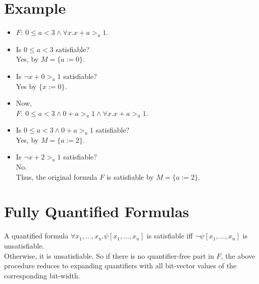 \documentclass{article}
\begin{document}
\section{Example}
	\begin{itemize}
		\item $F :\ 0 \le a < 3 \land \forall x . x + a >_u 1$.
		\item Is $0 \le a < 3$ satisfiable? \\
			\null\qquad Yes, by $M = \{a := 0\}$.
		\item Is $\neg x + 0 >_u 1$ satisfiable? \\
			\null\qquad Yes by $\{x := 0\}$.
		\item Now,\\
			$F :\ 0 \le a < 3 \land 0 + a >_u 1 \land \forall x . x + a >_u 1$.
		\item Is $0 \le a < 3 \land 0 + a >_u 1$ 
		satisfiable?\\
			\null\qquad Yes, by $M = \{a := 2\}$.
		\item Is $\neg x + 2 >_u 1$ satisfiable? \\
		\null\qquad No.\\
		\null\qquad Thus, the original formula $F$ is 
		satisfiable by $M = \{a := 2\}$.
	\end{itemize}
\section{Fully Quantified Formulas}
	A quantified formula $\forall x_1, ..., x_n. \psi [x_1, ..., x_n]$ is satisfiable iff 
	$\neg \psi [x_1, ..., x_n]$ is unsatisfiable.\\
	Otherwise, it is unsatisfiable. So if there is no 
	quantifier-free part in $F$, the above procedure 
	reduces to expanding quantifiers with all bit-vector
	values of the corresponding bit-width.
	
\end{document}
